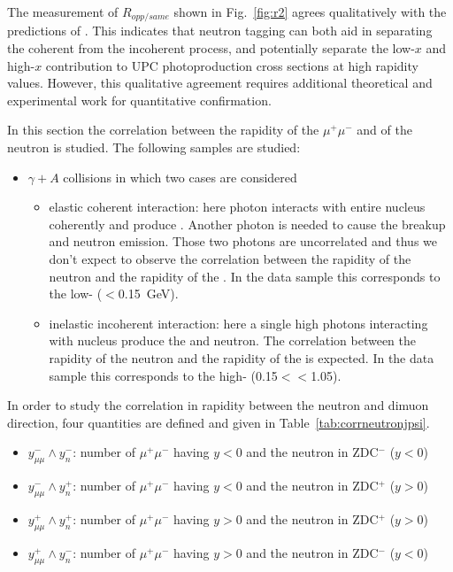     The measurement of $R_{opp/same}$ shown in Fig.~\ref{fig:r2} agrees 
      qualitatively with the predictions of \cite{Guzey:2013jaa}.
    This indicates that neutron tagging can both aid in separating the coherent
      from the incoherent process, and potentially separate the low-$x$ and 
      high-$x$ contribution to UPC photoproduction cross sections at high 
      rapidity values. 
    However, this qualitative agreement requires additional theoretical and 
      experimental work for quantitative confirmation. 

\iffalse
    In this section the correlation between the rapidity of the $\mu^{+}\mu^{-}$ 
      and of the neutron is studied. The following samples are studied: 
    \begin{itemize}
      \item $\gamma + A$ collisions in which two cases are considered
      \begin{itemize}
        \item elastic coherent interaction: here photon interacts with entire
          nucleus coherently and produce \JPsi. 
          Another photon is needed to cause the breakup and neutron emission. 
          Those two photons are uncorrelated and thus we don't expect to 
            observe the correlation between the rapidity of the neutron and the
            rapidity of the \JPsi.
          In the data sample this corresponds to the low-\pt \JPsi 
            (\pt$<$0.15~GeV). 
        \item inelastic incoherent interaction: here a single high \pt photons
          interacting with nucleus produce the \JPsi and neutron. 
          The correlation between the rapidity of the neutron and the rapidity
            of the \JPsi is expected.
          In the data sample this corresponds to the high-\pt \JPsi 
            (0.15$<$\pt$<$1.05). 
      \end{itemize}
    \end{itemize}

    In order to study the correlation in rapidity between the neutron and
      dimuon direction, four quantities are defined and given in 
      Table~\ref{tab:corrneutronjpsi}.  
    \begin{itemize}
      \item $y^{-}_{\mu\mu} \wedge y_{n}^{-}$: number of $\mu^{+}\mu^{-}$ having
         $y<0$ and the neutron in ZDC$^{-}$ ($y<0$)
      \item $y^{-}_{\mu\mu} \wedge y_{n}^{+}$: number of $\mu^{+}\mu^{-}$ having
         $y<0$ and the neutron in ZDC$^{+}$ ($y>0$)
      \item $y^{+}_{\mu\mu} \wedge y_{n}^{+}$: number of $\mu^{+}\mu^{-}$ having
         $y>0$ and the neutron in ZDC$^{+}$ ($y>0$)
      \item $y^{+}_{\mu\mu} \wedge y_{n}^{-}$: number of $\mu^{+}\mu^{-}$ having
         $y>0$ and the neutron in ZDC$^{-}$ ($y<0$)
    \end{itemize}

